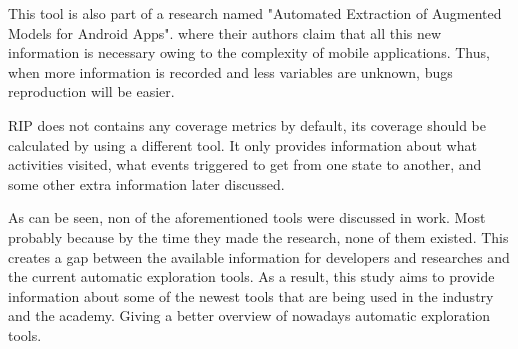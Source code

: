 This tool is also part of a research named "Automated Extraction of Augmented Models for Android Apps". where their authors claim that all this new information is necessary owing to the complexity of mobile applications. Thus, when more information is recorded and less variables are unknown, bugs reproduction will be easier.

RIP does not contains any coverage metrics by default, its coverage should be calculated by using a different tool. It only provides information about what activities visited, what events triggered to get from one state to another, and some other extra information later discussed.

As can be seen, non of the aforementioned tools were discussed in \cite{Choudhary, Gorla, Orso} work. Most probably because by the time they made the research, none of them existed. This creates a gap between the available information for developers and researches and the current automatic exploration tools. As a result, this study aims to provide information about some of the newest tools that are being used in the industry and the academy. Giving a better overview of nowadays automatic exploration tools.